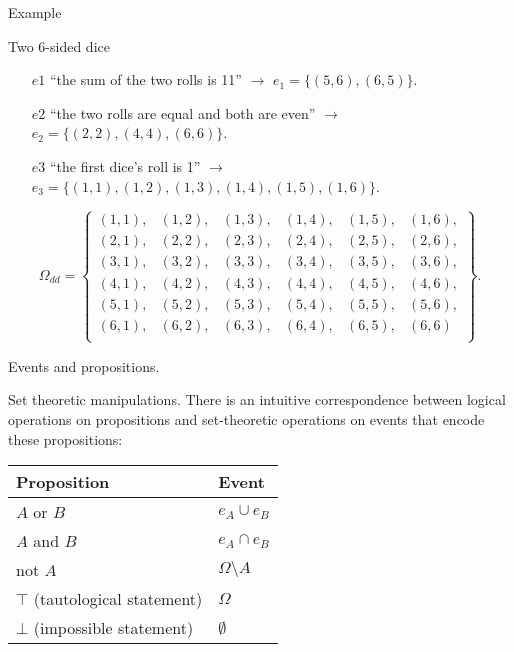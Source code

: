 \documentclass{beamer}
\begin{document}
\begin{frame}{Example}
  \begin{exampleblock}{Two $6$-sided dice}
    \begin{itemize}
    \item[$e1$] ``the sum of the two rolls is 11'' $\rightarrow$ $e_{1} = \{ (5, 6), (6, 5) \}$.
    \item[$e2$] ``the two rolls are equal and both are even'' $\rightarrow$ $e_{2} = \{(2,2), (4,4), (6,6)\}$.
    \item[$e3$] ``the first dice's roll is 1'' $\rightarrow$ $e_{3} = \{(1,1), (1,2), (1,3), (1,4), (1,5), (1,6)\}$.
    \end{itemize}

    \[ \Omega_{dd} = \left\{ \begin{array}{llllll}
      (1, 1), &(1, 2), &(1, 3), &(1, 4), &(1, 5), &(1, 6),\\
      (2, 1), &(2, 2), &(2, 3), &(2, 4), &(2, 5), &(2, 6),\\
      (3, 1), &(3, 2), &(3, 3), &(3, 4), &(3, 5), &(3, 6),\\
      (4, 1), &(4, 2), &(4, 3), &(4, 4), &(4, 5), &(4, 6),\\
      (5, 1), &(5, 2), &(5, 3), &(5, 4), &(5, 5), &(5, 6),\\
      (6, 1), &(6, 2), &(6, 3), &(6, 4), &(6, 5), &(6, 6)\\
      \end{array}
      \right \}.\]
    
  \end{exampleblock}
\end{frame}

\begin{frame}{Events and propositions.}

  \begin{block}{Set theoretic manipulations.}
    There is an intuitive correspondence between logical operations on propositions and set-theoretic operations on events that encode these propositions:
    \begin{center}
      \begin{tabular}{|l|l|}
        \hline
        Proposition & Event\\
        \hline
        $A$ or $B$ & $e_{A} \cup e_{B}$\\
        \hline
        $A$ and $B$ & $e_{A} \cap e_{B}$\\
        \hline
        not $A$ & $\Omega \setminus A$\\
        \hline
        $\top$ (tautological statement) & $\Omega$\\
        \hline
        $\bot$ (impossible statement) & $\emptyset$\\
        \hline        
      \end{tabular}
    \end{center}

  \end{block}
  
\end{frame}
\end{document}
